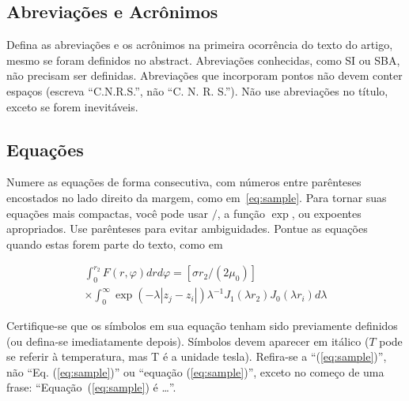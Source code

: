 \documentclass[a4paper]{ifacconf}
\begin{document}
\subsection{Abreviações e Acrônimos}

Defina as abreviações e os acrônimos na primeira ocorrência do texto do artigo, 
mesmo se foram definidos no abstract. Abreviações conhecidas, como SI ou SBA, não
precisam ser definidas. Abreviações que incorporam pontos não devem conter espaços
(escreva ``C.N.R.S.'', não ``C. N. R. S.''). Não use abreviações no título, exceto
se forem inevitáveis. 

\subsection{Equações}

Numere as equações de forma consecutiva, com números entre parênteses
encostados no lado direito da
margem, como em~\eqref{eq:sample}. Para tornar suas equações mais compactas,
você pode usar $/$, a função $\exp$, ou expoentes apropriados. Use parênteses para
evitar ambiguidades. Pontue as equações quando estas forem parte do texto, como em

\begin{multline} 
\int_0^{r_2}  F (r, \varphi ) dr d\varphi =  [\sigma r_2 / (2 \mu_0 )] \\
\times   \int_0^{\infty} \exp(-\lambda |z_j - z_i |) \lambda^{-1} J_1 (\lambda  r_2 ) J_0 (\lambda r_i ) d\lambda 
\label{eq:sample2}
\end{multline}

Certifique-se que os símbolos em sua equação tenham sido previamente definidos (ou defina-se imediatamente depois). Símbolos devem aparecer em itálico ($T$ pode
se referir à temperatura, mas T é a unidade tesla). 
Refira-se a ``(\ref{eq:sample})'', não ``Eq. (\ref{eq:sample})'' ou ``equação
(\ref{eq:sample})'', exceto no começo de uma frase: ``Equação~(\ref{eq:sample}) é \ldots''. 
\end{document}
